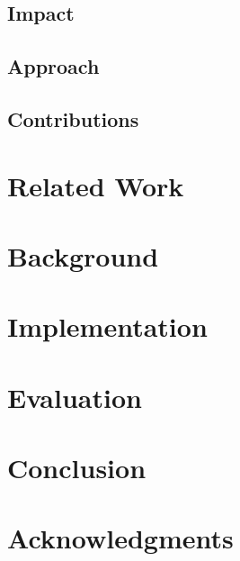 \documentclass[acmsmall, review, screen]{acmart}
\begin{document}
\subsection{Impact}
\subsection{Approach}
\subsection{Contributions}
\section{Related Work}
\section{Background}
\section{Implementation}
\section{Evaluation}
\section{Conclusion}
\section{Acknowledgments}
\end{document}
